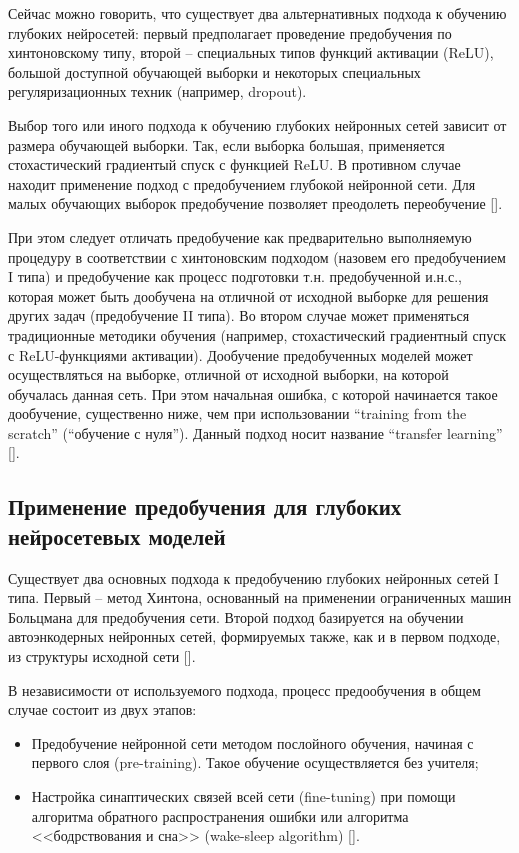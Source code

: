 Сейчас можно говорить, что существует два альтернативных подхода к обучению глубоких нейросетей: первый предполагает проведение предобучения по хинтоновскому типу, второй -- специальных типов функций активации (ReLU), большой доступной обучающей выборки и некоторых специальных регуляризационных техник (например, dropout).

Выбор того или иного подхода к обучению глубоких нейронных сетей зависит от размера обучающей выборки. Так, если выборка большая, применяется стохастический градиентый спуск с функцией ReLU. В противном случае находит применение подход с предобучением глубокой нейронной сети. Для малых обучающих выборок предобучение позволяет преодолеть переобучение [].

При этом следует отличать предобучение как предварительно выполняемую процедуру в соответствии с хинтоновским подходом (назовем его предобучением I типа) и предобучение как процесс подготовки т.н. предобученной и.н.с., которая может быть дообучена на отличной от исходной выборке для решения других задач (предобучение II типа). Во втором случае может применяться традиционные методики обучения (например, стохастический градиентный спуск с ReLU-функциями активации). Дообучение предобученных моделей может осуществляться на выборке, отличной от исходной выборки, на которой обучалась данная сеть. При этом начальная ошибка, с которой начинается такое дообучение, существенно ниже, чем при использовании ``training from the scratch'' (``обучение с нуля''). Данный подход носит название ``transfer learning'' [\scncite{}]. 

\subsection{Применение предобучения для глубоких нейросетевых моделей}

Существует два основных подхода к предобучению глубоких нейронных сетей I типа. Первый -- метод Хинтона, основанный на применении ограниченных машин Больцмана для предобучения сети. Второй подход базируется на обучении автоэнкодерных нейронных сетей, формируемых также, как и в первом подходе, из структуры исходной сети []. 

В независимости от используемого подхода, процесс предообучения в общем случае состоит из двух этапов: 
\begin{itemize}
	\item Предобучение нейронной сети методом послойного обучения, начиная с первого слоя  (pre-training). Такое обучение осуществляется без учителя;
	\item Настройка синаптических связей всей сети (fine-tuning) при помощи алгоритма обратного распространения ошибки или алгоритма <<бодрствования и сна>> (wake-sleep algorithm) [\scncite{}].
\end{itemize}

